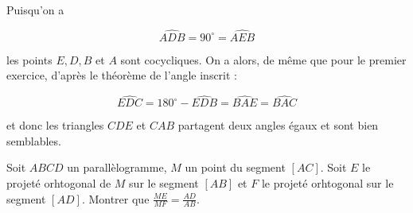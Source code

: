 \begin{sol}
\begin{center}
\end{center}

Puisqu'on a 

\[\widehat{ADB}=90^\circ=\widehat{AEB}\]

les points $E,D,B$ et $A$ sont cocycliques. On a alors, de même que pour le premier exercice, d'après le théorème de l'angle inscrit : 

\[\widehat{EDC}=180^\circ-\widehat{EDB}=\widehat{BAE}=\widehat{BAC}\]

et donc les triangles $CDE$ et $CAB$ partagent deux angles égaux et sont bien semblables. 
\end{sol}

\begin{exo}
Soit $ABCD$ un parallèlogramme, $M$ un point du segment $[AC]$. Soit $E$ le projeté orhtogonal de $M$ sur le segment $[AB]$ et $F$ le projeté orhtogonal sur le segment $[AD]$. Montrer que $\frac{ME}{MF}=\frac{AD}{AB}$. 
\end{exo}

